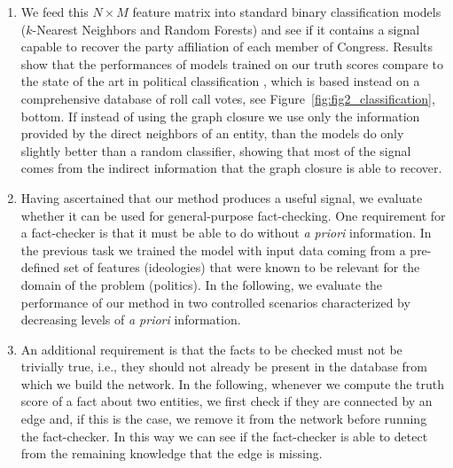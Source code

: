 \documentclass[10pt, letterpaper, english]{nature}
\begin{document}
\begin{enumerate}
        
    \item We feed this $N\times M$ feature matrix into standard binary
        classification models ($k$-Nearest Neighbors and Random Forests) and see
        if it contains a signal capable to recover the party affiliation of each
        member of Congress. Results show that the performances of models trained
        on our truth scores compare to the state of the art in political
        classification \cite{Poole2007}, which is based instead on a
        comprehensive database of roll call votes, see
        Figure~\ref{fig:fig2_classification}, bottom. If instead of using the
        graph closure we use only the information provided by the direct
        neighbors of an entity, than the models do only slightly better than a
        random classifier, showing that most of the signal comes from the
        indirect information that the graph closure is able to recover.

    \item Having ascertained that our method produces a useful signal, we
        evaluate whether it can be used for general-purpose fact-checking. One
        requirement for a fact-checker is that it must be able to do without
        \emph{a priori} information. In the previous task we trained the model
        with input data coming from a pre-defined set of features (ideologies)
        that were known to be relevant for the domain of the problem (politics).
        In the following, we evaluate the performance of our method in two
        controlled scenarios characterized by decreasing levels of \emph{a
        priori} information.
     
    \item An additional requirement is that the facts to be checked must not be
        trivially true, i.e., they should not already be present in the database
        from which we build the network. In the following, whenever we compute
        the truth score of a fact about two entities, we first check if they are
        connected by an edge and, if this is the case, we remove it from the
        network before running the fact-checker. In this way we can see if the
        fact-checker is able to detect from the remaining knowledge that the
        edge is missing.


\end{enumerate}
\end{document}
